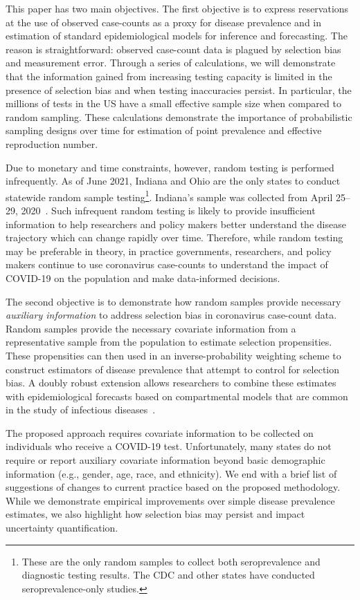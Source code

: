 \documentclass[11pt]{amsart}
\numberwithin{equation}{section}
\theoremstyle{plain}
\begin{document}
This paper has two main objectives.  The first objective is to express reservations at the use of observed case-counts as a proxy for disease prevalence and in estimation of standard epidemiological models for inference and forecasting.  The reason is straightforward: observed case-count data is plagued by selection bias and measurement error. Through a series of calculations, we will demonstrate that the information gained from increasing testing capacity is limited in the presence of selection bias and when testing inaccuracies persist.  In particular, the millions of tests in the US have a small effective sample size when compared to random sampling. These calculations demonstrate the importance of probabilistic sampling designs over time for estimation of point prevalence and effective reproduction number.

Due to monetary and time constraints, however, random testing is performed infrequently.  As of June 2021, Indiana and Ohio are the only states to conduct statewide random sample testing\footnote{These are the only random samples to collect both seroprevalence and diagnostic testing results. The CDC and other states have conducted seroprevalence-only studies.}. Indiana's sample was collected from April 25--29, 2020~\citep{Yiannoutsos2021}.  Such infrequent random testing is likely to provide insufficient information to help researchers and policy makers better understand the disease trajectory which can change rapidly over time.  Therefore, while random testing may be preferable in theory, in practice governments, researchers, and policy makers continue to use coronavirus case-counts to understand the impact of COVID-19 on the population and make data-informed decisions.

The second objective is to demonstrate how random samples provide necessary \emph{auxiliary information} to address selection bias in coronavirus case-count data.  Random samples provide the necessary covariate information from a representative sample from the population to estimate selection propensities. These propensities can then used in an inverse-probability weighting scheme to construct estimators of disease prevalence that attempt to control for selection bias.  A doubly robust extension allows researchers to combine these estimates with epidemiological forecasts based on compartmental models that are common in the study of infectious diseases~\citep{Hao2020,Song2020,Ray2020,Johndrow2020}.

The proposed approach requires covariate information to be collected on individuals who receive a COVID-19 test.  Unfortunately, many states do not require or report auxiliary covariate information beyond basic demographic information (e.g., gender, age, race, and ethnicity).  We end with a brief list of suggestions of changes to current practice based on the proposed methodology. While we demonstrate empirical improvements over simple disease prevalence estimates, we also highlight how selection bias may persist and impact uncertainty quantification.
\end{document}
